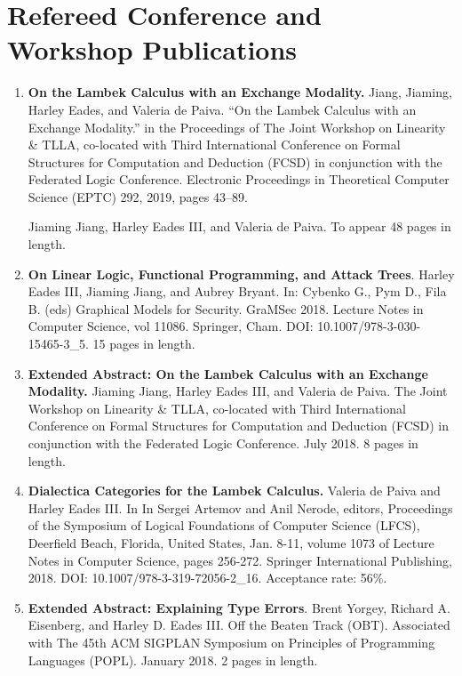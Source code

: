 \documentclass[11pt]{article}
\begin{document}
  \section{Refereed Conference and Workshop Publications}
  \label{subsec:symposium_publications}
  \begin{enumerate}

  \item[] \textbf{On the Lambek Calculus with an Exchange Modality.}
    Jiang, Jiaming, Harley Eades, and Valeria de Paiva. “On the Lambek
    Calculus with an Exchange Modality.” in the Proceedings of The
    Joint Workshop on Linearity \& TLLA, co-located with Third
    International Conference on Formal Structures for Computation and
    Deduction (FCSD) in conjunction with the Federated Logic
    Conference.  Electronic Proceedings in Theoretical Computer
    Science (EPTC) 292, 2019, pages 43–89.

    Jiaming Jiang, Harley Eades III, and Valeria de Paiva. To appear
     48 pages in length.
    
  \item[] \textbf{On Linear Logic, Functional Programming, and Attack
    Trees}. Harley Eades III, Jiaming Jiang, and Aubrey Bryant. In:
    Cybenko G., Pym D., Fila B. (eds) Graphical Models for
    Security. GraMSec 2018. Lecture Notes in Computer Science, vol
    11086. Springer, Cham. DOI: 10.1007/978-3-030-15465-3\_5. 15 pages
    in length.

  \item[] \textbf{Extended Abstract: On the Lambek Calculus with an
    Exchange Modality.}  Jiaming Jiang, Harley Eades III, and Valeria
    de Paiva. The Joint Workshop on Linearity \& TLLA, co-located with
    Third International Conference on Formal Structures for
    Computation and Deduction (FCSD) in conjunction with the Federated
    Logic Conference. July 2018. 8 pages in length.
    
  \item[] \textbf{Dialectica Categories for the Lambek Calculus.}
    Valeria de Paiva and Harley Eades III. In In Sergei Artemov and
    Anil Nerode, editors, Proceedings of the Symposium of Logical
    Foundations of Computer Science (LFCS), Deerfield Beach, Florida,
    United States, Jan. 8-11, volume 1073 of Lecture Notes in Computer
    Science, pages 256-272. Springer International Publishing,
    2018. DOI: 10.1007/978-3-319-72056-2\_16.  Acceptance rate: 56\%.    
    
  \item[] \textbf{Extended Abstract: Explaining Type Errors}.  Brent
    Yorgey, Richard A. Eisenberg, and Harley D. Eades III. Off the
    Beaten Track (OBT). Associated with The 45th ACM SIGPLAN Symposium
    on Principles of Programming Languages (POPL). January 2018. 2
    pages in length.
       

\end{enumerate}
\end{document}
